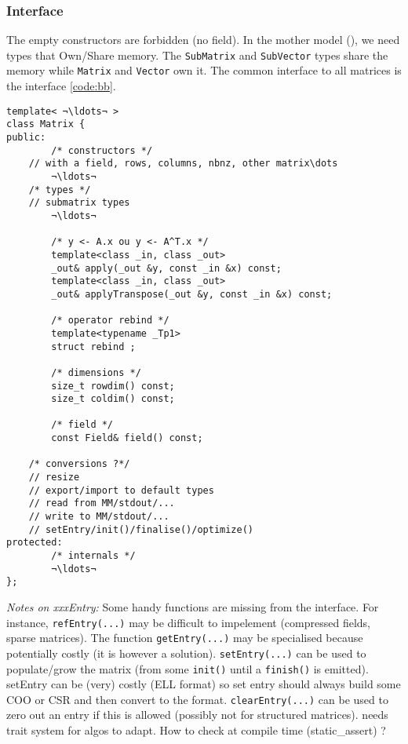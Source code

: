 \subsubsection{Interface}
%
The empty constructors are  forbidden (no field).
%
In the mother model (\cite{Dumas:2010:lbpar}), we need types that Own/Share
memory.  The \texttt{SubMatrix} and \texttt{SubVector} types share the memory
while \texttt{Matrix} and \texttt{Vector} own it.
%
The common interface to all matrices is the \applin  interface \cref{code:bb}.
{
\begin{lstlisting}
template< ¬\ldots¬ >
class Matrix {
public:
        /* constructors */
	// with a field, rows, columns, nbnz, other matrix\dots
        ¬\ldots¬
	/* types */
	// submatrix types
        ¬\ldots¬

        /* y <- A.x ou y <- A^T.x */
        template<class _in, class _out>
        _out& apply(_out &y, const _in &x) const;
        template<class _in, class _out>
        _out& applyTranspose(_out &y, const _in &x) const;

        /* operator rebind */
        template<typename _Tp1>
        struct rebind ;

        /* dimensions */
        size_t rowdim() const;
        size_t coldim() const;

        /* field */
        const Field& field() const;

	/* conversions ?*/
	// resize
	// export/import to default types
	// read from MM/stdout/...
	// write to MM/stdout/...
	// setEntry/init()/finalise()/optimize()
protected:
        /* internals */
        ¬\ldots¬
};
\end{lstlisting}
}

\emph{Notes on xxxEntry:}
%
Some handy functions are missing from the \applin interface.
%
For instance, \texttt{refEntry(...)} may be difficult to impelement (compressed
fields, sparse matrices).
%
The function \texttt{getEntry(...)} may be specialised because potentially
costly (it is however a solution).
%
\texttt{setEntry(...)} can be used to populate/grow the matrix (from some
\texttt{init()} until a \texttt{finish()} is emitted).  setEntry can be (very)
costly (ELL format) so set entry should always build some COO or CSR and then
convert to the format.
%
\texttt{clearEntry(...)} can be used to zero out an entry if this is allowed
(possibly not for structured matrices).
%
\danger needs trait system for algos to adapt. How to check at compile time
(static\_assert) ?
%
